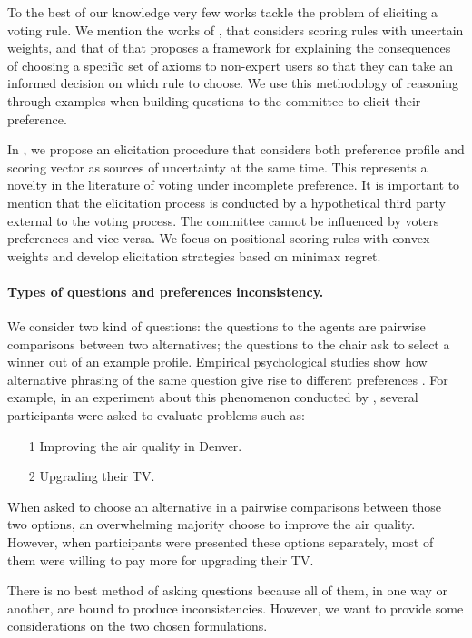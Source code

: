 To the best of our knowledge very few works tackle the problem of eliciting a voting rule. We mention the works of \citet{Llamazares2013,Viappiani2018}, that considers scoring rules with uncertain weights, and that of \citet{Cailloux2014} that proposes a framework for explaining the consequences of choosing a specific set of axioms to non-expert users so that they can take an informed decision on which rule to choose.
We use this methodology of reasoning through examples when building questions to the committee to elicit their preference.

In , we propose an elicitation procedure that considers both preference profile and scoring vector as sources of uncertainty at the same time. This represents a novelty in the literature of voting under incomplete preference. It is important to mention that the elicitation process is conducted by a hypothetical third party external to the voting process. The committee cannot be influenced by voters preferences and vice versa. 
We focus on positional scoring rules with convex weights and develop elicitation strategies based on minimax regret. 

\paragraph{Types of questions and preferences inconsistency.}
We consider two kind of questions: the questions to the agents are pairwise comparisons between two alternatives; the questions to the chair ask to select a winner out of an example profile.
Empirical psychological studies show how alternative phrasing of the same question give rise to different preferences \citep{Tversky1986}. 
For example, in an experiment about this phenomenon conducted by \citet{Irwin1993}, several participants were asked to evaluate problems such as:
\begin{itemize}[nosep]
	\item[1] Improving the air quality in Denver.
	\item[2] Upgrading their TV.
\end{itemize}
When asked to choose an alternative in a pairwise comparisons between those two options, an overwhelming majority choose to improve the air quality. However, when participants were presented these options separately, most of them were willing to pay more for upgrading their TV.

There is no best method of asking questions because all of them, in one way or another, are bound to produce inconsistencies. However, we want to provide some considerations on the two chosen formulations.

